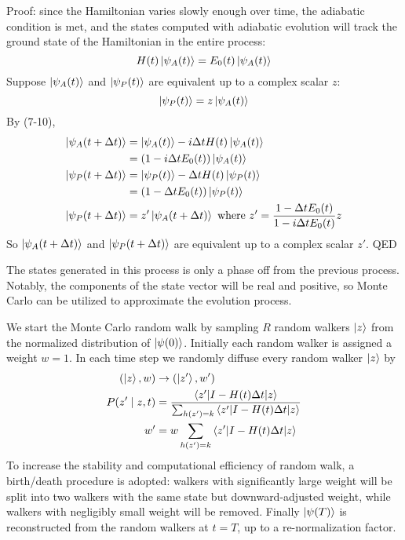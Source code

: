 \documentclass[12pt]{article}
\begin{document}
Proof: since the Hamiltonian varies slowly enough over time, the adiabatic condition is met, and the states computed with adiabatic evolution will track the ground state of the Hamiltonian in the entire process: 
\begin{equation}
	H(t) \ket{\psi_A(t)} = E_0(t) \ket{\psi_A(t)}
\end{equation}
Suppose $\ket{\psi_A(t)}$ and $\ket{\psi_P(t)}$ are equivalent up to a complex scalar $z$: 
\begin{equation}
	\ket{\psi_P(t)} = z \ket{\psi_A(t)}
\end{equation}
By (7-10), 
\begin{align}
	\ket{\psi_A(t+\Delta{t})} 
		&= \ket{\psi_A(t)} - i \Delta{t} H(t) \ket{\psi_A(t)} \\
		&= (1 - i \Delta{t} E_0(t)) \ket{\psi_A(t)} \\
	\ket{\psi_P(t+\Delta{t})} 
		&= \ket{\psi_P(t)} - \Delta{t} H(t) \ket{\psi_P(t)} \\
		&= (1 - \Delta{t} E_0(t)) \ket{\psi_P(t)} \\
	\ket{\psi_P(t+\Delta{t})} &= z' \ket{\psi_A(t+\Delta{t})} \text{ where }
	z' = \frac{1 - \Delta{t} E_0(t)}{1 - i \Delta{t} E_0(t)} z
\end{align}
So $\ket{\psi_A(t+\Delta{t})}$ and $\ket{\psi_P(t+\Delta{t})}$ are equivalent up to a complex scalar $z'$. QED

The states generated in this process is only a phase off from the previous process. Notably, the components of the state vector will be real and positive, so Monte Carlo can be utilized to approximate the evolution process. 

We start the Monte Carlo random walk by sampling $R$ random walkers $\ket{z}$ from the normalized distribution of $\ket{\psi(0)}$. Initially each random walker is assigned a weight $w = 1$. In each time step we randomly diffuse every random walker $\ket{z}$ by 
\begin{align}
	(\ket{z}, w) &\rightarrow (\ket{z'}, w') \\
	P(z' \mid z, t) &= \frac{\braket{z'|I - H(t) \Delta{t}|z}}{\sum_{h(z')=k}{\braket{z'|I - H(t) \Delta{t}|z}}} \\
	w' &= w \sum_{h(z')=k}{\braket{z'|I - H(t) \Delta{t}|z}}
\end{align}
To increase the stability and computational efficiency of random walk, a birth/death procedure is adopted: walkers with significantly large weight will be split into two walkers with the same state but downward-adjusted weight, while walkers with negligibly small weight will be removed. Finally $\ket{\psi(T)}$ is reconstructed from the random walkers at $t = T$, up to a re-normalization factor. 
\end{document}
